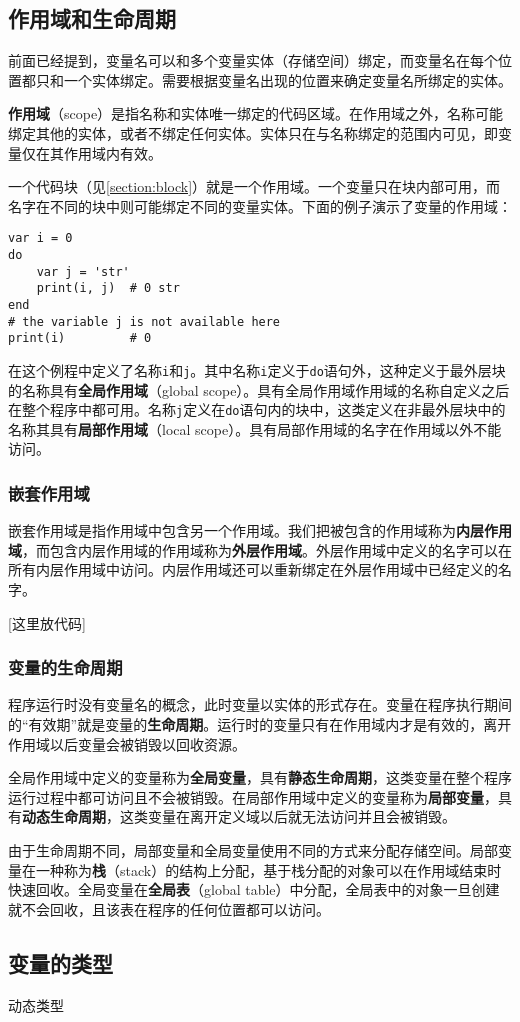 \subsection{作用域和生命周期} \label{section::scope_life}

前面已经提到，变量名可以和多个变量实体（存储空间）绑定，而变量名在每个位置都只和一个实体绑定。需要根据变量名出现的位置来确定变量名所绑定的实体。

\textbf{作用域}（scope）是指名称和实体唯一绑定的代码区域。在作用域之外，名称可能绑定其他的实体，或者不绑定任何实体。实体只在与名称绑定的范围内可见，即变量仅在其作用域内有效。

一个代码块（见\ref{section:block}）就是一个作用域。一个变量只在块内部可用，而名字在不同的块中则可能绑定不同的变量实体。下面的例子演示了变量的作用域：
\begin{lstlisting}[language=berry]
var i = 0
do
    var j = 'str'
    print(i, j)  # 0 str
end
# the variable j is not available here
print(i)         # 0
\end{lstlisting}
在这个例程中定义了名称\texttt{i}和\texttt{j}。其中名称\texttt{i}定义于\texttt{do}语句外，这种定义于最外层块的名称具有\textbf{全局作用域}（global scope）。具有全局作用域作用域的名称自定义之后在整个程序中都可用。名称\texttt{j}定义在\texttt{do}语句内的块中，这类定义在非最外层块中的名称其具有\textbf{局部作用域}（local scope）。具有局部作用域的名字在作用域以外不能访问。

\subsubsection{嵌套作用域}

嵌套作用域是指作用域中包含另一个作用域。我们把被包含的作用域称为\textbf{内层作用域}，而包含内层作用域的作用域称为\textbf{外层作用域}。外层作用域中定义的名字可以在所有内层作用域中访问。内层作用域还可以重新绑定在外层作用域中已经定义的名字。

[这里放代码]

\subsubsection{变量的生命周期}

程序运行时没有变量名的概念，此时变量以实体的形式存在。变量在程序执行期间的``有效期''就是变量的\textbf{生命周期}。运行时的变量只有在作用域内才是有效的，离开作用域以后变量会被销毁以回收资源。

全局作用域中定义的变量称为\textbf{全局变量}，具有\textbf{静态生命周期}，这类变量在整个程序运行过程中都可访问且不会被销毁。在局部作用域中定义的变量称为\textbf{局部变量}，具有\textbf{动态生命周期}，这类变量在离开定义域以后就无法访问并且会被销毁。

由于生命周期不同，局部变量和全局变量使用不同的方式来分配存储空间。局部变量在一种称为\textbf{栈}（stack）的结构上分配，基于栈分配的对象可以在作用域结束时快速回收。全局变量在\textbf{全局表}（global table）中分配，全局表中的对象一旦创建就不会回收，且该表在程序的任何位置都可以访问。

\subsection{变量的类型}

动态类型
